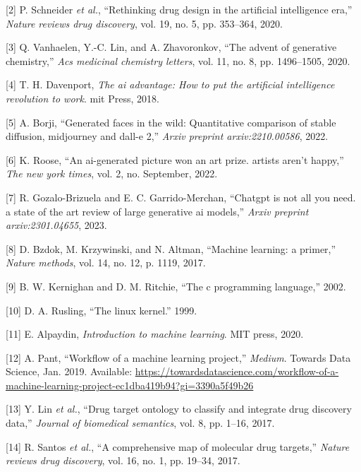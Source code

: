 \documentclass[11pt]{article}
\begin{document}
\hypertarget{citeproc_bib_item_2}{[2] P. Schneider \textit{et al.}, “Rethinking drug design in the artificial intelligence era,” \textit{Nature reviews drug discovery}, vol. 19, no. 5, pp. 353–364, 2020.}

\hypertarget{citeproc_bib_item_3}{[3] Q. Vanhaelen, Y.-C. Lin, and A. Zhavoronkov, “The advent of generative chemistry,” \textit{Acs medicinal chemistry letters}, vol. 11, no. 8, pp. 1496–1505, 2020.}

\hypertarget{citeproc_bib_item_4}{[4] T. H. Davenport, \textit{The ai advantage: How to put the artificial intelligence revolution to work}. mit Press, 2018.}

\hypertarget{citeproc_bib_item_5}{[5] A. Borji, “Generated faces in the wild: Quantitative comparison of stable diffusion, midjourney and dall-e 2,” \textit{Arxiv preprint arxiv:2210.00586}, 2022.}

\hypertarget{citeproc_bib_item_6}{[6] K. Roose, “An ai-generated picture won an art prize. artists aren’t happy,” \textit{The new york times}, vol. 2, no. September, 2022.}

\hypertarget{citeproc_bib_item_7}{[7] R. Gozalo-Brizuela and E. C. Garrido-Merchan, “Chatgpt is not all you need. a state of the art review of large generative ai models,” \textit{Arxiv preprint arxiv:2301.04655}, 2023.}

\hypertarget{citeproc_bib_item_8}{[8] D. Bzdok, M. Krzywinski, and N. Altman, “Machine learning: a primer,” \textit{Nature methods}, vol. 14, no. 12, p. 1119, 2017.}

\hypertarget{citeproc_bib_item_9}{[9] B. W. Kernighan and D. M. Ritchie, “The c programming language,” 2002.}

\hypertarget{citeproc_bib_item_10}{[10] D. A. Rusling, “The linux kernel.” 1999.}

\hypertarget{citeproc_bib_item_11}{[11] E. Alpaydin, \textit{Introduction to machine learning}. MIT press, 2020.}

\hypertarget{citeproc_bib_item_12}{[12] A. Pant, “Workflow of a machine learning project,” \textit{Medium}. Towards Data Science, Jan. 2019. Available: \url{https://towardsdatascience.com/workflow-of-a-machine-learning-project-ec1dba419b94?gi=3390a5f49b26}}

\hypertarget{citeproc_bib_item_13}{[13] Y. Lin \textit{et al.}, “Drug target ontology to classify and integrate drug discovery data,” \textit{Journal of biomedical semantics}, vol. 8, pp. 1–16, 2017.}

\hypertarget{citeproc_bib_item_14}{[14] R. Santos \textit{et al.}, “A comprehensive map of molecular drug targets,” \textit{Nature reviews drug discovery}, vol. 16, no. 1, pp. 19–34, 2017.}
\end{document}
